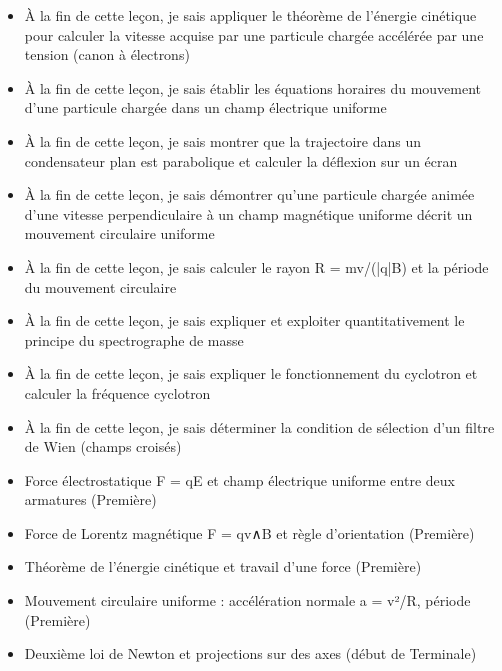 \documentclass[11pt]{article}
\begin{document}
\begin{objectifs}
\begin{itemize}
\item À la fin de cette leçon, je sais appliquer le théorème de l'énergie cinétique pour calculer la vitesse acquise par une particule chargée accélérée par une tension (canon à électrons)
\item À la fin de cette leçon, je sais établir les équations horaires du mouvement d'une particule chargée dans un champ électrique uniforme
\item À la fin de cette leçon, je sais montrer que la trajectoire dans un condensateur plan est parabolique et calculer la déflexion sur un écran
\item À la fin de cette leçon, je sais démontrer qu'une particule chargée animée d'une vitesse perpendiculaire à un champ magnétique uniforme décrit un mouvement circulaire uniforme
\item À la fin de cette leçon, je sais calculer le rayon R = mv/(|q|B) et la période du mouvement circulaire
\item À la fin de cette leçon, je sais expliquer et exploiter quantitativement le principe du spectrographe de masse
\item À la fin de cette leçon, je sais expliquer le fonctionnement du cyclotron et calculer la fréquence cyclotron
\item À la fin de cette leçon, je sais déterminer la condition de sélection d'un filtre de Wien (champs croisés)
\end{itemize}
\end{objectifs}

\begin{prerequis}
\begin{itemize}
\item Force électrostatique F = qE et champ électrique uniforme entre deux armatures (Première)
\item Force de Lorentz magnétique F = qv∧B et règle d'orientation (Première)
\item Théorème de l'énergie cinétique et travail d'une force (Première)
\item Mouvement circulaire uniforme : accélération normale a = v²/R, période (Première)
\item Deuxième loi de Newton et projections sur des axes (début de Terminale)
\end{itemize}
\end{prerequis}

\newpage
\end{document}
